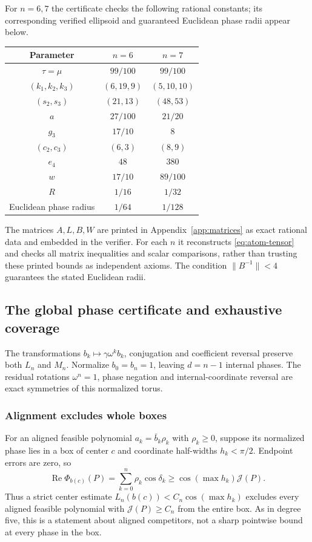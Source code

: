 \documentclass[11pt]{article}
\newcommand{\J}{\mathcal J}
\DeclareMathOperator{\Rea}{Re}
\begin{document}
For $n=6,7$ the certificate checks the following rational constants; its corresponding verified ellipsoid and guaranteed Euclidean phase radii appear below.
\begin{center}\small
\begin{tabular}{c|cc}
\toprule Parameter&$n=6$&$n=7$\\\midrule
$\tau=\mu$&$99/100$&$99/100$\\
$(k_1,k_2,k_3)$&$(6,19,9)$&$(5,10,10)$\\
$(s_2,s_3)$&$(21,13)$&$(48,53)$\\
$a$&$27/100$&$21/20$\\
$g_3$&$17/10$&$8$\\
$(c_2,c_3)$&$(6,3)$&$(8,9)$\\
$e_4$&$48$&$380$\\
$w$&$17/10$&$89/100$\\
$R$&$1/16$&$1/32$\\
Euclidean phase radius&$1/64$&$1/128$\\\bottomrule
\end{tabular}
\end{center}
The matrices $A,L,B,W$ are printed in Appendix~\ref{app:matrices} as exact rational data and embedded in the verifier.  For each $n$ it reconstructs \eqref{eq:atom-tensor} and checks all matrix inequalities and scalar comparisons, rather than trusting these printed bounds as independent axioms.  The condition $\|B^{-1}\|<4$ guarantees the stated Euclidean radii.

\subsection{The global phase certificate and exhaustive coverage}\label{sec:global67}
The transformations $b_k\mapsto\gamma\omega^kb_k$, conjugation and
coefficient reversal preserve both $L_n$ and $M_n$. Normalize
$b_0=b_n=1$, leaving $d=n-1$ internal phases. The residual rotations
$\omega^n=1$, phase negation and internal-coordinate reversal are exact
symmetries of this normalized torus.

\subsubsection{Alignment excludes whole boxes}
For an aligned feasible polynomial $a_k=\bar b_k\rho_k$ with
$\rho_k\ge0$, suppose its normalized phase lies in a box of center $c$
and coordinate half-widths $h_k<\pi/2$. Endpoint errors are zero, so
\begin{equation}\label{eq:phasealign}
 \Rea\Phi_{b(c)}(P)=\sum_{k=0}^n\rho_k\cos\delta_k
 \ge\cos(\max h_k)\J(P).
\end{equation}
Thus a strict center estimate $L_n(b(c))<C_n\cos(\max h_k)$ excludes
every aligned feasible polynomial with $\J(P)\ge C_n$ from the entire
box. As in degree five, this is a statement about aligned competitors,
not a sharp pointwise bound at every phase in the box.
\end{document}
